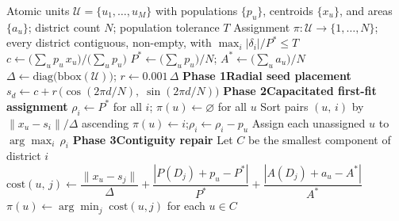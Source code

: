 \begin{algorithm}[htbp]
\caption{DualBalance Districting}
\label{alg:dualbalance}
\begin{algorithmic}[1]
\Require Atomic units $\mathcal{U}=\{u_1,\dots,u_M\}$ with populations
         $\{p_u\}$, centroids $\{x_u\}$, and areas $\{a_u\}$;
         district count $N$; population tolerance $T$
\Ensure  Assignment $\pi:\mathcal{U}\to\{1,\dots,N\}$;
         every district contiguous, non-empty, with
         $\max_i|\delta_i|/P^* \leq T$
\vspace{4pt}
\State $c \leftarrow \bigl(\sum_u p_u\,x_u\bigr)\big/\bigl(\sum_u p_u\bigr)$
\State $P^* \leftarrow \bigl(\sum_u p_u\bigr)/N$;\enspace
       $A^* \leftarrow \bigl(\sum_u a_u\bigr)/N$
\State $\Delta \leftarrow \mathrm{diag}\bigl(\mathrm{bbox}(\mathcal{U})\bigr)$;\enspace
       $r \leftarrow 0.001\,\Delta$
\vspace{4pt}
\Statex \hspace{-\algorithmicindent}\textbf{Phase 1\enspace Radial seed placement}
    \State $s_d \leftarrow c + r\,\bigl(\cos(2\pi d/N),\;\sin(2\pi d/N)\bigr)$
\EndFor
\vspace{4pt}
\Statex \hspace{-\algorithmicindent}\textbf{Phase 2\enspace Capacitated first-fit assignment}
\State $\rho_i \leftarrow P^*$ for all $i$;\enspace
       $\pi(u) \leftarrow \varnothing$ for all $u$
\State Sort pairs $(u,\,i)$ by $\|x_u - s_i\|/\Delta$ ascending
        \State $\pi(u) \leftarrow i$;\enspace $\rho_i \leftarrow \rho_i - p_u$
    \EndIf
\EndFor
\State Assign each unassigned $u$ to $\arg\max_i\,\rho_i$
\vspace{4pt}
\Statex \hspace{-\algorithmicindent}\textbf{Phase 3\enspace Contiguity repair}
    \State Let $C$ be the smallest component of district $i$
        \State $\mathrm{cost}(u,\,j) \leftarrow
               \dfrac{\|x_u - s_j\|}{\Delta}
               + \dfrac{|P(D_j)+p_u-P^*|}{P^*}
               + \dfrac{|A(D_j)+a_u-A^*|}{A^*}$
    \EndFor
    \State $\pi(u) \leftarrow \arg\min_j\;\mathrm{cost}(u,j)$ for each $u \in C$

\end{algorithmic}
\end{algorithm}
